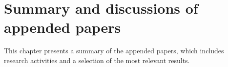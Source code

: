 \chapter{Summary and discussions of appended papers}\label{ch:results}
\noindent This chapter presents a summary of the appended papers, which includes research activities and a selection of the most relevant results.





%





